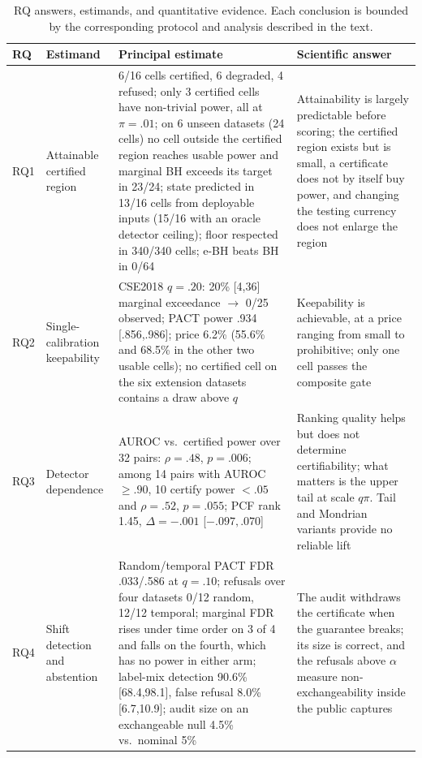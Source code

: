 \documentclass[a4paper,fleqn]{cas-dc}
\begin{document}
\begin{table}[t]
\centering
\caption{RQ answers, estimands, and quantitative evidence. Each conclusion is bounded by the corresponding protocol and analysis described in the text.}
\label{tab:rqanswers}
\scriptsize
\setlength{\tabcolsep}{3pt}
\begin{tabularx}{\textwidth}{L{0.28}L{1.08}L{1.16}L{1.48}}
\toprule
RQ & Estimand & Principal estimate & Scientific answer \\
\midrule
RQ1 & Attainable certified region & 6/16 cells certified, 6 degraded, 4 refused; only 3 certified cells have non-trivial power, all at $\pi=.01$; on 6 unseen datasets (24 cells) no cell outside the certified region reaches usable power and marginal BH exceeds its target in 23/24; state predicted in 13/16 cells from deployable inputs (15/16 with an oracle detector ceiling); floor respected in 340/340 cells; e-BH beats BH in 0/64 & Attainability is largely predictable before scoring; the certified region exists but is small, a certificate does not by itself buy power, and changing the testing currency does not enlarge the region \\
RQ2 & Single-calibration keepability & CSE2018 $q=.20$: 20\% [4,36] marginal exceedance $\rightarrow$ 0/25 observed; PACT power .934 [.856,.986]; price 6.2\% (55.6\% and 68.5\% in the other two usable cells); no certified cell on the six extension datasets contains a draw above $q$ & Keepability is achievable, at a price ranging from small to prohibitive; only one cell passes the composite gate \\
RQ3 & Detector dependence & AUROC vs.\ certified power over 32 pairs: $\rho=.48$, $p=.006$; among 14 pairs with AUROC $\geq.90$, 10 certify power $<.05$ and $\rho=.52$, $p=.055$; PCF rank 1.45, $\Delta=-.001$ [$-.097,.070$] & Ranking quality helps but does not determine certifiability; what matters is the upper tail at scale $q\pi$. Tail and Mondrian variants provide no reliable lift \\
RQ4 & Shift detection and abstention & Random/temporal PACT FDR .033/.586 at $q=.10$; refusals over four datasets 0/12 random, 12/12 temporal; marginal FDR rises under time order on 3 of 4 and falls on the fourth, which has no power in either arm; label-mix detection 90.6\% [68.4,98.1], false refusal 8.0\% [6.7,10.9]; audit size on an exchangeable null 4.5\% vs.\ nominal 5\% & The audit withdraws the certificate when the guarantee breaks; its size is correct, and the refusals above $\alpha$ measure non-exchangeability inside the public captures \\
\bottomrule
\end{tabularx}
\end{table}
\end{document}
